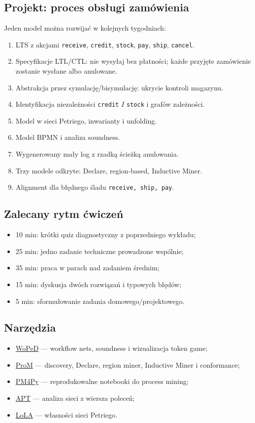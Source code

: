 \documentclass[11pt,a4paper]{article}
\begin{document}
\subsection{Projekt: proces obsługi zamówienia}
Jeden model można rozwijać w kolejnych tygodniach:
\begin{enumerate}
\item LTS z akcjami \texttt{receive}, \texttt{credit}, \texttt{stock}, \texttt{pay}, \texttt{ship}, \texttt{cancel}.
\item Specyfikacje LTL/CTL: nie wysyłaj bez płatności; każde przyjęte zamówienie zostanie wysłane albo anulowane.
\item Abstrakcja przez symulację/bisymulację: ukrycie kontroli magazynu.
\item Identyfikacja niezależności \texttt{credit} $I$ \texttt{stock} i grafów zależności.
\item Model w sieci Petriego, inwarianty i unfolding.
\item Model BPMN i analiza soundness.
\item Wygenerowany mały log z rzadką ścieżką anulowania.
\item Trzy modele odkryte: Declare, region-based, Inductive Miner.
\item Alignment dla błędnego śladu \texttt{receive, ship, pay}.
\end{enumerate}

\subsection{Zalecany rytm ćwiczeń}
\begin{itemize}
\item 10 min: krótki quiz diagnostyczny z poprzedniego wykładu;
\item 25 min: jedno zadanie techniczne prowadzone wspólnie;
\item 35 min: praca w parach nad zadaniem średnim;
\item 15 min: dyskusja dwóch rozwiązań i typowych błędów;
\item 5 min: sformułowanie zadania domowego/projektowego.
\end{itemize}

\subsection{Narzędzia}
\begin{itemize}
\item \href{https://woped.dhbw-karlsruhe.de/}{WoPeD} --- workflow nets, soundness i wizualizacja token game;
\item \href{https://promtools.org/}{ProM} --- discovery, Declare, region miner, Inductive Miner i conformance;
\item \href{https://pm4py.fit.fraunhofer.de/}{PM4Py} --- reprodukowalne notebooki do process mining;
\item \href{https://github.com/CvO-Theory/apt}{APT} --- analiza sieci z wiersza poleceń;
\item \href{https://service-technology.org/lola/}{LoLA} --- własności sieci Petriego.
\end{itemize}
\end{document}
